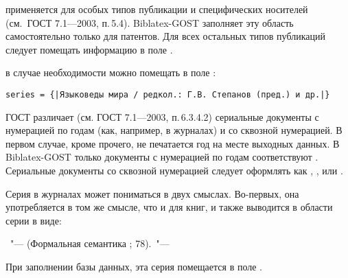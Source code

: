 \documentclass[10pt,a4paper,headings=small,numbers=enddot,english,russian]{ltxdockit}[2011/03/25]
\newcommand*{\biblatexgost}{Biblatex-GOST\xspace}
\newcommand*{\gostbibname}[1][]{ГОСТ#1 7.1---2003}
\newcommand*{\gostbibref}[2][]{\gostbibname[#1], п.\,#2}
\newcommand*{\notimpl}{\footnote{Не реализовано в данной версии \biblatexgost.}}
\newenvironment{bibexample}{\begin{list}
     {}
     {\setlength{\leftmargin}{\parindent}%
      \setlength{\itemindent}{-\leftmargin}%
      \setlength{\parsep}{0pt}}}
  {\end{list}}
\begin{document}
\begin{description}
%
%
\item[Область специфических сведений] применяется для
особых типов публикации и специфических носителей (см.~\gostbibref{5.4}).
\biblatexgost заполняет эту область самостоятельно только для
патентов.
Для всех остальных типов публикаций
следует помещать информацию в поле .


\item[Cведения об ответственности серии] в случае необходимости можно помещать
в поле :
\begin{lstlisting}[style=bibtex,escapechar=|]
series = {|Языковеды мира / редкол.: Г.В. Степанов (пред.) и др.|}
\end{lstlisting}

\item[Серия.] \label{series}ГОСТ различает (см. \gostbibref{6.3.4.2}) сериальные документы
с нумерацией по годам
(как, например, в журналах) и со сквозной нумерацией. В первом случае, кроме прочего,
не печатается год на месте выходных данных. В \biblatexgost только документы
с нумерацией по годам соответствуют .  Сериальные документы со
сквозной нумерацией следует оформлять как , ,
 или .

Серия в журналах может пониматься в двух смыслах. Во-первых, она употребляется в
том же смысле, что и для книг, и также выводится в области серии в виде:

\begin{bibexample}
\item \textellipsis~"--- (Формальная семантика ; 78).~"--- \textellipsis
\end{bibexample}

При заполнении базы данных, эта серия помещается в поле .


\end{description}
\end{document}
